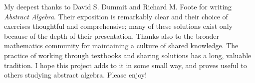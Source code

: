 My deepest thanks to David S. Dummit and Richard M. Foote for writing \textit{Abstract Algebra}.
Their exposition is remarkably clear and their choice of exercises thoughtful and comprehensive; many of these solutions exist only because of the depth of their presentation.
Thanks also to the broader mathematics community for maintaining a culture of shared knowledge.
The practice of working through textbooks and sharing solutions has a long, valuable tradition.
I hope this project adds to it in some small way, and proves useful to others studying abstract algebra.
Please enjoy!